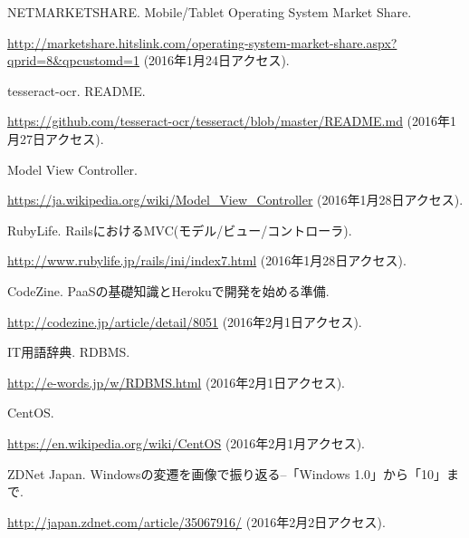 \begin{thebibliography}{99}
NETMARKETSHARE. Mobile/Tablet Operating System Market Share.

\url{http://marketshare.hitslink.com/operating-system-market-share.aspx?qprid=8&qpcustomd=1}
(2016年1月24日アクセス).

tesseract-ocr. README.

\url{https://github.com/tesseract-ocr/tesseract/blob/master/README.md}
(2016年1月27日アクセス).

Model View Controller.

\url{https://ja.wikipedia.org/wiki/Model_View_Controller}
(2016年1月28日アクセス).

RubyLife. RailsにおけるMVC(モデル/ビュー/コントローラ).

\url{http://www.rubylife.jp/rails/ini/index7.html}
(2016年1月28日アクセス).

CodeZine. PaaSの基礎知識とHerokuで開発を始める準備.

\url{http://codezine.jp/article/detail/8051}
(2016年2月1日アクセス).

IT用語辞典. RDBMS.

\url{http://e-words.jp/w/RDBMS.html}
(2016年2月1日アクセス).

CentOS.

\url{https://en.wikipedia.org/wiki/CentOS}
(2016年2月1月アクセス).


ZDNet Japan. Windowsの変遷を画像で振り返る--「Windows 1.0」から「10」まで.

\url{http://japan.zdnet.com/article/35067916/}
(2016年2月2日アクセス).

\end{thebibliography}